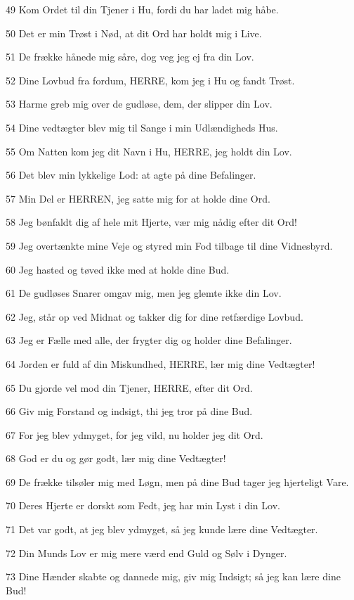 \par 49 Kom Ordet til din Tjener i Hu, fordi du har ladet mig håbe.
\par 50 Det er min Trøst i Nød, at dit Ord har holdt mig i Live.
\par 51 De frække hånede mig såre, dog veg jeg ej fra din Lov.
\par 52 Dine Lovbud fra fordum, HERRE, kom jeg i Hu og fandt Trøst.
\par 53 Harme greb mig over de gudløse, dem, der slipper din Lov.
\par 54 Dine vedtægter blev mig til Sange i min Udlændigheds Hus.
\par 55 Om Natten kom jeg dit Navn i Hu, HERRE, jeg holdt din Lov.
\par 56 Det blev min lykkelige Lod: at agte på dine Befalinger.
\par 57 Min Del er HERREN, jeg satte mig for at holde dine Ord.
\par 58 Jeg bønfaldt dig af hele mit Hjerte, vær mig nådig efter dit Ord!
\par 59 Jeg overtænkte mine Veje og styred min Fod tilbage til dine Vidnesbyrd.
\par 60 Jeg hasted og tøved ikke med at holde dine Bud.
\par 61 De gudløses Snarer omgav mig, men jeg glemte ikke din Lov.
\par 62 Jeg, står op ved Midnat og takker dig for dine retfærdige Lovbud.
\par 63 Jeg er Fælle med alle, der frygter dig og holder dine Befalinger.
\par 64 Jorden er fuld af din Miskundhed, HERRE, lær mig dine Vedtægter!
\par 65 Du gjorde vel mod din Tjener, HERRE, efter dit Ord.
\par 66 Giv mig Forstand og indsigt, thi jeg tror på dine Bud.
\par 67 For jeg blev ydmyget, for jeg vild, nu holder jeg dit Ord.
\par 68 God er du og gør godt, lær mig dine Vedtægter!
\par 69 De frække tilsøler mig med Løgn, men på dine Bud tager jeg hjerteligt Vare.
\par 70 Deres Hjerte er dorskt som Fedt, jeg har min Lyst i din Lov.
\par 71 Det var godt, at jeg blev ydmyget, så jeg kunde lære dine Vedtægter.
\par 72 Din Munds Lov er mig mere værd end Guld og Sølv i Dynger.
\par 73 Dine Hænder skabte og dannede mig, giv mig Indsigt; så jeg kan lære dine Bud!
